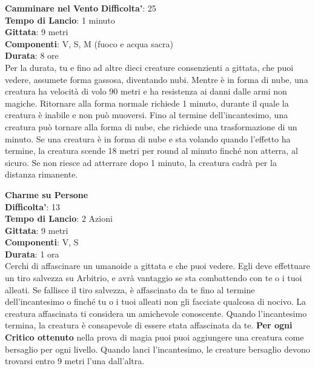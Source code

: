 \begin{multicols}{2}
\medskip\textbf{Camminare nel Vento}
\textbf{Difficolta'}: 25\\
\textbf{Tempo di Lancio}: 1 minuto\\
\textbf{Gittata}: 9 metri\\
\textbf{Componenti}: V, S, M (fuoco e acqua sacra)\\
\textbf{Durata}: 8 ore\\
Per la durata, tu e fino ad altre dieci creature consenzienti a gittata, che puoi vedere, assumete forma gassosa, diventando nubi. Mentre è in forma di nube, una creatura ha velocità di volo 90 metri e ha resistenza ai danni dalle armi non magiche. Ritornare alla forma normale richiede 1 minuto, durante il quale la creatura è inabile e non può muoversi. Fino al termine dell’incantesimo, una creatura può tornare alla forma di nube, che richiede una trasformazione di un minuto. Se una creatura è in forma di nube e sta volando quando l’effetto ha termine, la creatura scende 18 metri per round al minuto finché non atterra, al sicuro. Se non riesce ad atterrare dopo 1 minuto, la creatura cadrà per la distanza rimanente.

\medskip\textbf{Charme su Persone}\\
\textbf{Difficolta'}: 13\\
\textbf{Tempo di Lancio}: 2 Azioni\\
\textbf{Gittata}: 9 metri\\
\textbf{Componenti}: V, S\\
\textbf{Durata}: 1 ora\\
Cerchi di affascinare un umanoide a gittata e che puoi vedere. Egli deve effettuare un tiro salvezza su Arbitrio, e avrà vantaggio se sta combattendo con te o i tuoi alleati. Se fallisce il tiro salvezza, è affascinato da te fino al termine dell’incantesimo o finché tu o i tuoi alleati non gli facciate qualcosa di nocivo. La creatura affascinata ti considera un amichevole conoscente. Quando l’incantesimo termina, la creatura è consapevole di essere stata affascinata da te. 
\textbf{Per ogni Critico ottenuto} nella prova di magia puoi puoi aggiungere una creatura come bersaglio per ogni livello. Quando lanci l’incantesimo, le creature bersaglio devono trovarsi entro 9 metri l’una dall’altra.



\end{multicols}
